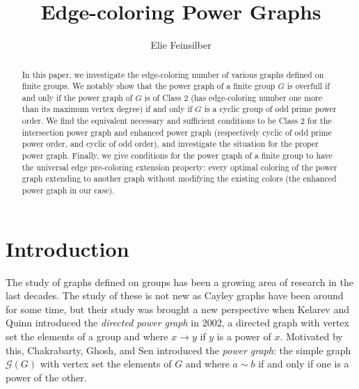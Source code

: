 \documentclass{article}
\title{Edge-coloring Power Graphs}
\author{}
\date{Elie Feinsilber}
\theoremstyle{definition}
\theoremstyle{indentclaim}
\theoremstyle{named}
\theoremstyle{named}
\begin{document}
\maketitle

\begin{abstract}
In this paper, we investigate the edge-coloring number of various graphs defined on finite groups. We notably show that the power graph of a finite group $G$ is overfull if and
only if the power graph of $G$ is of Class $2$ (has edge-coloring number one more
than its maximum vertex degree) if and only if $G$ is a cyclic group of odd prime
power order. We find the equivalent necessary and sufficient conditions to be Class $2$ for the intersection power graph and enhanced power graph (respectively cyclic of odd prime power order, and cyclic of odd order), and investigate the situation for the proper power graph. Finally, we give conditions for the power graph of a finite group to have the universal edge pre-coloring extension property: every optimal coloring of the power graph extending to another graph without modifying the existing colors (the enhanced power graph in our case). 
\end{abstract}

\section{Introduction}

The study of graphs defined on groups has been a growing area of research in the last decades. The study of these is not new as Cayley graphs have been around for some time, but their study was brought a new perspective when Kelarev and Quinn \cite{KelarevQuinn} introduced the \textit{directed power graph} in 2002, a directed graph with vertex set the elements of a group and where $x \rightarrow y$ if $y$ is a power of $x$. Motivated by this, Chakrabarty, Ghosh, and Sen \cite{C-G-S} introduced the \textit{power graph}: the simple graph $\mathscr{G}(G)$ with vertex set the elements of $G$ and where $a \sim b$ if and only if one is a power of the other. 
\end{document}
